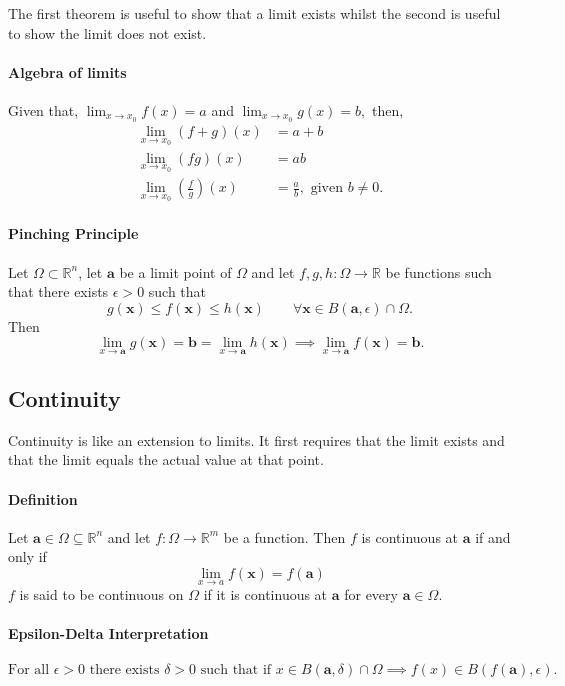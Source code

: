 The first theorem is useful to show that a limit exists whilst the second is useful to
show the limit does not exist.

\paragraph{Algebra of limits}
Given that, \(\lim_{x\to x_0} f(x) = a\) and \(\lim_{x\to x_0} g(x) = b,\) then,
\begin{align*}
    \lim_{x\to x_0} (f + g)(x) & = a + b \\
    \lim_{x\to x_0} (fg)(x) & = ab \\
    \lim_{x\to x_0} (\frac{f}{g})(x) & = \frac{a}{b}, \text{ given } b \neq 0.
\end{align*}

\paragraph{Pinching Principle}
Let \(\Omega \subset \mathbb{R}^n\), let \(\textbf{a}\) be a limit point of \(\Omega\)
and let \(f,g ,h: \Omega \rightarrow \mathbb{R}\) be functions such that there exists
\(\epsilon > 0\) such that 
\[
    g(\textbf{x}) \leq f(\textbf{x}) \leq h(\textbf{x}) \qquad
    \forall \textbf{x} \in B(\textbf{a}, \epsilon) \cap \Omega.
\] 
Then
\[
    \lim_{x\to \textbf{a}} g(\textbf{x}) = \textbf{b} = \lim_{x\to \textbf{a}} h(\textbf{x}) 
    \implies \lim_{x\to \textbf{a}} f(\textbf{x}) = \textbf{b}.
\]

\subsection{Continuity}
Continuity is like an extension to limits. It first requires that the limit exists and that
the limit equals the actual value at that point.
\paragraph{Definition}
Let \(\textbf{a}\in\Omega \subseteq\mathbb{R}^n\) and let \(f:\Omega\rightarrow\mathbb{R}^m\) 
be a function. Then \(f\) is continuous at \(\textbf{a}\) if and only if 
\[\lim_{x\to a} f(\textbf{x}) = f(\textbf{a})\]
\(f\) is said to be continuous on \(\Omega\) if it is continuous at \(\textbf{a}\)
for every \(\textbf{a}\in\Omega\).


\paragraph{Epsilon-Delta Interpretation}
\[
    \text{For all } \epsilon > 0 \text{ there exists } \delta > 0 \text{ such that if }
    x\in B(\textbf{a}, \delta) \cap \Omega \implies f(x) \in B(f(\textbf{a}), \epsilon).
\]


